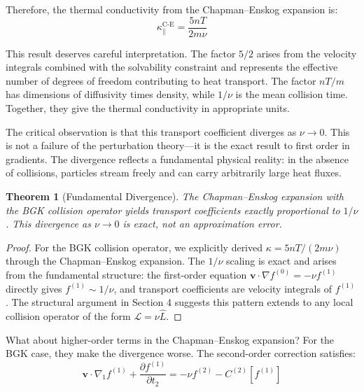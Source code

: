 \documentclass[12pt,a4paper]{article}
\newtheorem{theorem}{Theorem}[section]
\newcommand{\vect}[1]{\mathbf{#1}}
\begin{document}
Therefore, the thermal conductivity from the Chapman--Enskog expansion is:
\begin{equation}
\boxed{\kappa_{\parallel}^{\text{C-E}} = \frac{5nT}{2m\nu}}
\label{eq:thermal_conductivity_ce}
\end{equation}

This result deserves careful interpretation. The factor $5/2$ arises from the velocity integrals combined with the solvability constraint and represents the effective number of degrees of freedom contributing to heat transport. The factor $nT/m$ has dimensions of diffusivity times density, while $1/\nu$ is the mean collision time. Together, they give the thermal conductivity in appropriate units.

The critical observation is that this transport coefficient diverges as $\nu \to 0$. This is not a failure of the perturbation theory—it is the exact result to first order in gradients. The divergence reflects a fundamental physical reality: in the absence of collisions, particles stream freely and can carry arbitrarily large heat fluxes.

\begin{theorem}[Fundamental Divergence]
\label{thm:divergence}
The Chapman--Enskog expansion with the BGK collision operator yields transport coefficients exactly proportional to $1/\nu$. This divergence as $\nu \to 0$ is exact, not an approximation error.
\end{theorem}

\begin{proof}
For the BGK collision operator, we explicitly derived $\kappa = 5nT/(2m\nu)$ through the Chapman--Enskog expansion. The $1/\nu$ scaling is exact and arises from the fundamental structure: the first-order equation $\vect{v} \cdot \nabla f^{(0)} = -\nu f^{(1)}$ directly gives $f^{(1)} \sim 1/\nu$, and transport coefficients are velocity integrals of $f^{(1)}$. The structural argument in Section 4 suggests this pattern extends to any local collision operator of the form $\mathcal{L} = \nu\hat{L}$.
\end{proof}

What about higher-order terms in the Chapman--Enskog expansion? For the BGK case, they make the divergence worse. The second-order correction satisfies:
\begin{equation}
\vect{v} \cdot \nabla_1 f^{(1)} + \frac{\partial f^{(1)}}{\partial t_2} = -\nu f^{(2)} - C^{(2)}[f^{(1)}]
\label{eq:second_order}
\end{equation}
\end{document}
